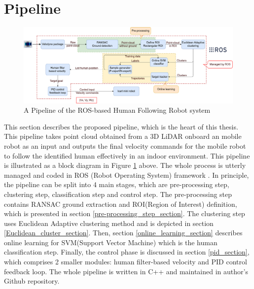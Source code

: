 \section{Pipeline}
\label{whole_pipeline_intro}

\begin{figure}[h]
    \centering
    \includegraphics[width=1.0\linewidth]{figures/chap3_fig/pipeline.png}
    \caption{A Pipeline of the ROS-based Human Following Robot system}
    \label{Chap3:Fig1}
\end{figure}

This section describes the proposed pipeline, which is the heart of this thesis.
This pipeline takes point cloud obtained from a 3D LiDAR onboard an mobile robot as an input
and outputs the final velocity commands for the mobile robot to follow the identified human effectively in
an indoor environment. This pipeline is illustrated as a block diagram in Figure \ref{Chap3:Fig1} above.
The whole process is utterly managed and coded in ROS (Robot Operating System) framework \cite{ros_original}.
In principle, the pipeline can be split into 4 main stages, which are pre-processing step, clustering step,
classification step and control step. The pre-processing step contains RANSAC ground extraction and ROI(Region of Interest) definition,
which is presented in section \ref{pre-processing_step_section}. The clustering step uses Euclidean Adaptive clustering method and is depicted
in section \ref{Euclidean_cluster_section}. Then, section \ref{online_learning_section} describes online learning for SVM(Support Vector Machine) which is the human classification
step. Finally, the control phase is discussed in section \ref{pid_section}, which comprises 2 smaller modules: human filter-based velocity
and PID control feedback loop. The whole pipeline is written in C++ and maintained in author's Github repository.


